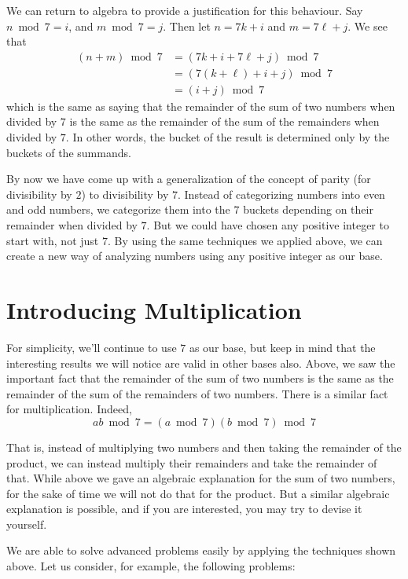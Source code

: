 \documentclass[a4paper,10pt]{report}
\begin{document}
We can return to algebra to provide a justification for this behaviour. Say \(n
\bmod 7 = i\), and \(m \bmod 7 = j\). Then let \(n = 7k + i\) and \(m = 7\ell +
j\). We see that \begin{align*}
 (n + m) \bmod 7
 &= (7k+i + 7\ell+j) \bmod 7 \\
 &= (7(k+\ell) + i + j) \bmod 7 \\
 &= (i + j) \bmod 7
\end{align*} which is the same as saying that the remainder of the sum of two
numbers when divided by \(7\) is the same as the remainder of the sum of the
remainders when divided by \(7\). In other words, the bucket of the result is
determined only by the buckets of the summands.

By now we have come up with a generalization of the concept of parity (for
divisibility by \(2\)) to divisibility by \(7\). Instead of categorizing
numbers into even and odd numbers, we categorize them into the \(7\) buckets
depending on their remainder when divided by \(7\). But we could have chosen
any positive integer to start with, not just \(7\). By using the same
techniques we applied above, we can create a new way of analyzing numbers using
any positive integer as our base.

\section{Introducing Multiplication}

For simplicity, we'll continue to use \(7\) as our base, but keep in mind that
the interesting results we will notice are valid in other bases also. Above, we
saw the important fact that the remainder of the sum of two numbers is the same
as the remainder of the sum of the remainders of two numbers. There is a
similar fact for multiplication. Indeed, \[ ab \bmod 7 = (a \bmod 7)(b \bmod 7)
\bmod 7 \]

That is, instead of multiplying two numbers and then taking the remainder of
the product, we can instead multiply their remainders and take the remainder of
that. While above we gave an algebraic explanation for the sum of two numbers,
for the sake of time we will not do that for the product. But a similar
algebraic explanation is possible, and if you are interested, you may try to
devise it yourself.

We are able to solve advanced problems easily by applying the techniques shown
above. Let us consider, for example, the following problems:
\end{document}
